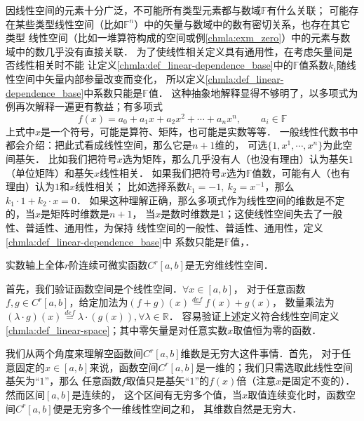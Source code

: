 因线性空间的元素十分广泛，不可能所有类型元素都与数域$\mathbb{F}$有什么关联；
可能存在某些类型线性空间（比如$\mathbb{F}^n$）中的矢量与数域中的数有密切关系，也存在其它类型
线性空间（比如一堆算符构成的空间或例\ref{chmla:exm_zero}）中的元素与数域中的数几乎没有直接关联．
为了使线性相关定义具有通用性，在考虑矢量间是否线性相关时不能
让定义\ref{chmla:def_linear-dependence_base}中的$\mathbb{F}$值系数$k_i$随线性空间中矢量内部参量改变而变化，
所以定义\ref{chmla:def_linear-dependence_base}中系数只能是$\mathbb{F}$值．
这种抽象地解释显得不够明了，以多项式为例再次解释一遍更有教益；有多项式
\begin{equation}
    f(x)=a_0+a_1 x+ a_2 x^2 + \cdots+ a_n x^n, \qquad a_i \in \mathbb{F}
\end{equation}
上式中$x$是一个符号，可能是算符、矩阵，也可能是实数等等．
一般线性代数书中都会介绍：把此式看成线性空间，那么它是$n+1$维的，
可选$\{1,x^1,\cdots,x^n\}$为此空间基矢．
比如我们把符号$x$选为矩阵，那么几乎没有人（也没有理由）认为基矢$1$（单位矩阵）和基矢$x$线性相关．
如果我们把符号$x$选为$\mathbb{F}$值数，可能有人（也有理由）认为$1$和$x$线性相关；
比如选择系数$k_1 =-1, \ k_2 = x^{-1}$，那么$k_1 \cdot 1 + k_2 \cdot x =0 $．
如果这种理解正确，那么多项式作为线性空间的维数是不定的，当$x$是矩阵时维数是$n+1$，
当$x$是数时维数是$1$；这使线性空间失去了一般性、普适性、通用性，为保持
线性空间的一般性、普适性、通用性，定义\ref{chmla:def_linear-dependence_base}中
系数只能是$\mathbb{F}$值，．


\begin{example}\label{chmla:exm-cab}
    实数轴上全体$r$阶连续可微实函数$C^r[a,b]$是无穷维线性空间．
\end{example}
首先，我们验证函数空间是个线性空间．$\forall x\in [a,b]$，
对于任意函数$f,g\in C^r[a,b]$，给定加法为$(f+g)(x)\overset{def}{=}f(x)+g(x)$，
数量乘法为$(\lambda \cdot g) (x)\overset{def}{=}\lambda \cdot (g (x)), \forall \lambda \in \mathbb{R}$．
容易验证上述定义符合线性空间定义\ref{chmla:def_linear-space}；其中零矢量是对任意实数$x$取值恒为零的函数．

我们从两个角度来理解空函数间$C^r[a,b]$维数是无穷大这件事情．首先，
对于任意固定的$x\in [a,b]$来说，函数空间$C^r[a,b]$是一维的；我们只需选取此线性空间基矢为“$1$”，那么
任意函数$f$取值只是基矢“$1$”的$f(x)$倍（注意$x$是固定不变的）．然而区间$[a,b]$是连续的，
这个区间有无穷多个值，当$x$取值连续变化时，函数空间$C^r[a,b]$便是无穷多个一维线性空间之和，
其维数自然是无穷大．

